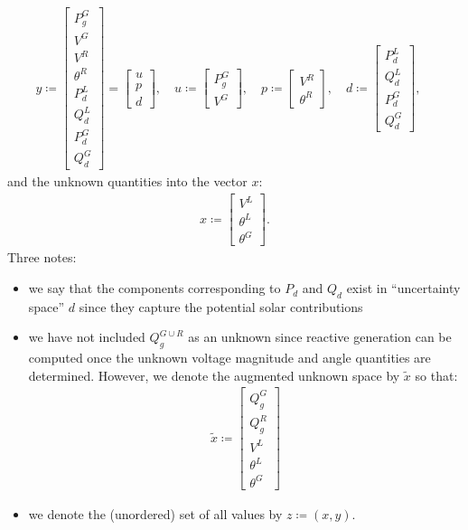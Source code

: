 \begin{align}
y \coloneqq
\begin{bmatrix}
P_{g}^G \\ V^G \\ V^R \\ \theta^R \\ P_{d}^L \\ Q_{d}^L \\ P_d^G \\ Q_d^G
\end{bmatrix}
=
\begin{bmatrix}
u \\ p \\ d
\end{bmatrix}, \quad
u \coloneqq
\begin{bmatrix}
P_{g}^G \\ V^G
\end{bmatrix}, \quad
p \coloneqq
\begin{bmatrix}
V^R \\ \theta^R
\end{bmatrix}, \quad
d \coloneqq
\begin{bmatrix}
P_{d}^L \\ Q_{d}^L \\ P_d^G \\ Q_d^G
\end{bmatrix}, \quad
\end{align}
and the unknown quantities into the vector $x$:
\begin{align}
x \coloneqq
\begin{bmatrix}
V^L \\ \theta^L \\ \theta^G
\end{bmatrix}.
\end{align}
Three notes:
\begin{itemize}
	\item we say that the components corresponding to $P_d$ and $Q_d$ exist in ``uncertainty space'' $d$ since they capture the potential solar contributions
	\item we have not included $Q_{g}^{G \cup R}$ as an unknown since reactive generation can be computed once the unknown voltage magnitude and angle quantities are determined. However, we denote the augmented unknown space by $\tilde{x}$ so that:
	\begin{align}
	\tilde{x} \coloneqq
	\begin{bmatrix}
	Q_g^G \\ Q_g^R \\ V^L \\ \theta^L \\ \theta^G
	\end{bmatrix}
	\end{align}
	\item we denote the (unordered) set of all values by $z \coloneqq (x,y)$.
\end{itemize}

